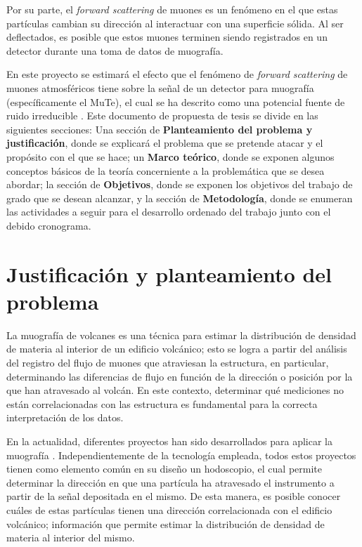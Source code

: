\documentclass[12pt]{report}
\begin{document}
Por su parte, el \textit{forward scattering} de muones es un fenómeno en el que estas partículas cambian su dirección al interactuar con una superficie sólida. Al ser deflectados, es posible que estos muones terminen siendo registrados en un detector durante una toma de datos de muografía.

En este proyecto se estimará el efecto que el fenómeno de \textit{forward scattering} de muones atmosféricos tiene sobre la señal de un detector para muografía (específicamente el MuTe), el cual se ha descrito como una potencial fuente de ruido irreducible \cite{gomez2017forward}. Este documento de propuesta de tesis se divide en las siguientes secciones: Una sección de \textbf{Planteamiento del problema y justificación}, donde se explicará el problema que se pretende atacar y el propósito con el que se hace; un \textbf{Marco teórico}, donde se exponen algunos conceptos básicos de la teoría concerniente a la problemática que se desea abordar; la sección de \textbf{Objetivos}, donde se exponen los objetivos del trabajo de grado que se desean alcanzar, y la sección de \textbf{Metodología}, donde se enumeran las actividades a seguir para el desarrollo ordenado del trabajo junto con el debido cronograma.


\section*{Justificación y planteamiento del problema}

La muografía de volcanes es una técnica para estimar la distribución de densidad de
materia al interior de un edificio volcánico; esto se logra a partir del análisis del
registro del flujo de muones que atraviesan la estructura, en particular, determinando
las diferencias de flujo en función de la dirección o posición por la que
han atravesado al volcán. En este contexto, determinar qué mediciones no están correlacionadas 
con las estructura es fundamental para la correcta interpretación de los datos.

En la actualidad, diferentes proyectos han sido desarrollados para aplicar la 
muografía \cite{kaiser2019muography,saracino2019applications}. Independientemente de la tecnología empleada, todos estos proyectos 
tienen como elemento común en su diseño un hodoscopio, el cual permite determinar la
dirección en que una partícula ha atravesado el instrumento a partir de la señal
depositada en el mismo. De esta manera, es posible conocer cuáles de estas partículas tienen una dirección correlacionada con el edificio volcánico; información que permite estimar la distribución de densidad de materia al interior del mismo.
\end{document}
